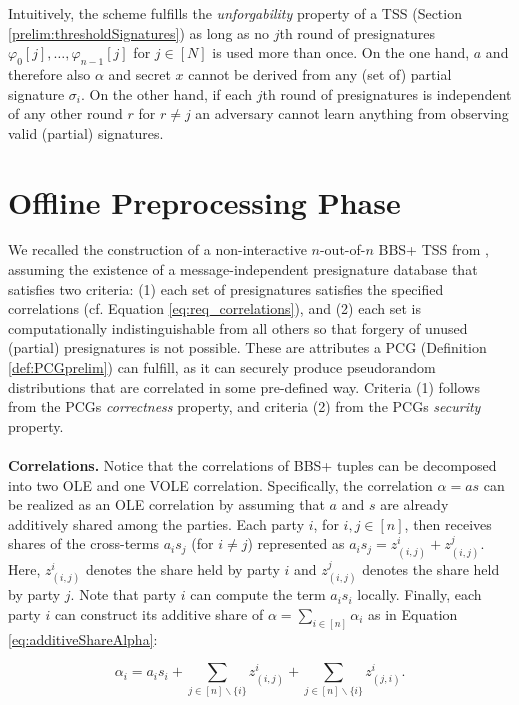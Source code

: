 Intuitively, the scheme fulfills the \textit{unforgability} property of a TSS (Section \ref{prelim:thresholdSignatures}) as long as no $j$th round of presignatures $\varphi_{0}[j], \ldots, \varphi_{n-1}[j]$ for $j \in [N]$  is used more than once. On the one hand, $a$ and therefore also $\alpha$ and secret $x$ cannot be derived from any (set of) partial signature $\sigma_i$. On the other hand, if each $j$th round of presignatures is independent of any other round $r$ for $r \neq j$ an adversary cannot learn anything from observing valid (partial) signatures.

\section{Offline Preprocessing Phase}
We recalled the construction of a non-interactive $n$-out-of-$n$ BBS+ TSS from \cite{cryptoeprint:2023/1076}, assuming the existence of a message-independent presignature database that satisfies two criteria: (1) each set of presignatures satisfies the specified correlations (cf. Equation \ref{eq:req_correlations}), and (2) each set is computationally indistinguishable from all others so that forgery of unused (partial) presignatures is not possible. These are attributes a PCG (Definition \ref{def:PCGprelim}) can fulfill, as it can securely produce pseudorandom distributions that are correlated in some pre-defined way. Criteria (1) follows from the PCGs \textit{correctness} property, and criteria (2) from the PCGs \textit{security} property.
\\\\
\textbf{Correlations.} Notice that the correlations of BBS+ tuples can be decomposed into two OLE and one VOLE correlation. Specifically, the correlation $\alpha = as$ can be realized as an OLE correlation by assuming that $a$ and $s$ are already additively shared among the parties. Each party $i$, for $i, j \in [n]$, then receives shares of the cross-terms $a_is_j$ (for $i \neq j$) represented as  $a_is_j = z_{(i,j)}^i+z_{(i,j)}^j$. Here, $z_{(i,j)}^i$ denotes the share held by party $i$ and $z_{(i,j)}^j$ denotes the share held by party $j$. Note that party $i$ can compute the term $a_is_i$ locally. Finally, each party $i$ can construct its additive share of $\alpha = \sum_{i\in [n]}\alpha_i$ as in Equation \ref{eq:additiveShareAlpha}:

\begin{equation}
  \alpha_i=a_is_i + \sum_{j \in [n]\backslash \{i\}}{z_{(i,j)}^i} + \sum_{j \in [n]\backslash \{i\}}z_{(j,i)}^i.
  \label{eq:additiveShareAlpha}
\end{equation}

